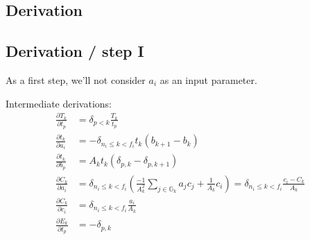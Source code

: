 \documentclass{article}
\begin{document}
\begin{appendices}
    
    \section{Derivation}
    
    \subsection{Derivation / step I}
    
    As a first step, we'll not consider $a_i$ as an input parameter.

    Intermediate derivations:
    \begin{align}
        \frac{\partial T_k}{\partial t_p} & = \delta_{p<k} \frac{T_k}{t_p} \nonumber \\
        \frac{\partial t_k}{\partial a_i} & = - \delta_{n_i \leq k < f_i} t_k (b_{k+1}-b_k) \nonumber \\
        \frac{\partial t_k}{\partial b_p} & = A_k t_k (\delta_{p,k} - \delta_{p,k+1}) \nonumber \\
        \frac{\partial C_k}{\partial a_i} & = \delta_{n_i \leq k < f_i} ( \frac{-1}{A_k^2} \sum_{j \in \mathbb{G}_k} a_j c_j + \frac{1}{A_k} c_i) = \delta_{n_i \leq k < f_i} \frac{c_i-C_k}{A_k} \nonumber \\
        \frac{\partial C_k}{\partial c_i} & = \delta_{n_i \leq k < f_i} \frac{a_i}{A_k} \nonumber \\
        \frac{\partial E_k}{\partial t_p} & = - \delta_{p,k} \nonumber
    \end{align}


\end{appendices}
\end{document}

